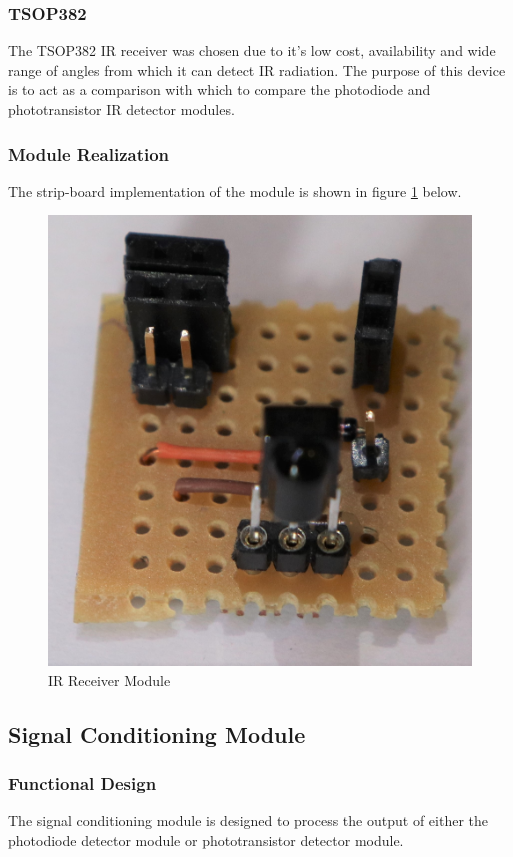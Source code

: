 \subsubsection{TSOP382}

The TSOP382 IR receiver was chosen due to it's low cost, availability and wide range of angles from which it can detect IR radiation. The purpose of this device is to act as a comparison with which to compare the photodiode and phototransistor IR detector modules.


\subsubsection{Module Realization}
The strip-board implementation of the module is shown in figure \ref{fig:module_ir_receiver} below.

\begin{figure}[H]
	\centering
	\includegraphics[width=.6\textwidth]{figures/modules/ir_receiver.jpg}
	\caption{IR Receiver Module}
	\label{fig:module_ir_receiver}
\end{figure}






\subsection{Signal Conditioning Module}

\subsubsection{Functional Design}
The signal conditioning module is designed to process the output of either the photodiode detector module or phototransistor detector module.

